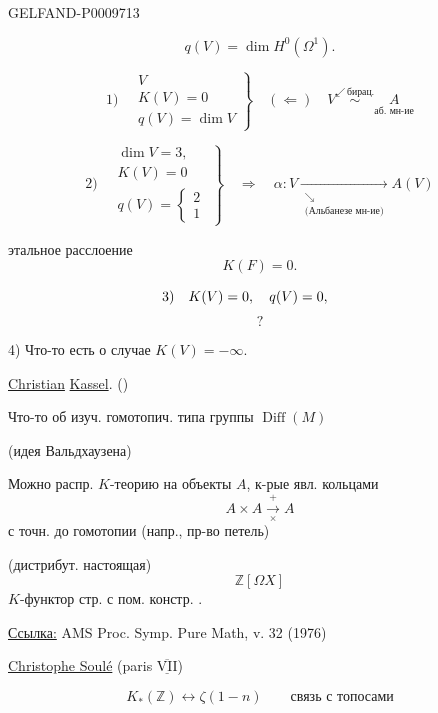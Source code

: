 \begin{GelfandAdjacentEvidence}{GELFAND-P000971}{3}


\[
 q(V)=\dim H^0(\Omega^1).
\]

\[
 1)\quad
 \left.\begin{gathered} V\\ K(V)=0\\ q(V)=\dim V \end{gathered}\right\}
 \quad(\Leftarrow)\quad
 V\overset{\swarrow\,\text{бирац.}}{\sim}\underset{\text{аб. мн-ие}}{A}
\]

\[
 2)\quad
 \left.\begin{gathered}
 \dim V=3,\\K(V)=0\\q(V)=\begin{cases}2\\1\end{cases}
 \end{gathered}\right\}
 \quad\Rightarrow\quad
 \alpha\colon V\underset{\substack{\searrow\\\text{(Альбанезе мн-ие)}}}{\longrightarrow}A(V)
\]

этальное расслоение
\[
 K(F)=0.
\]

\[
 3)\quad K(V)=0,\quad q(V)=0,
 \qquad\text{\vphantom{$K(V)$}}
\]
\[
 ?
\]

4) Что-то есть о случае $K(V)=-\infty$.

\underline{Christian} \underline{Kassel}. ()

Что-то об изуч. гомотопич. типа группы $\operatorname{Diff}(M)$

(идея Вальдхаузена)

Можно распр. $K$-теорию на объекты $A$, к-рые явл. кольцами
\[
 A\times A\overset{+}{\underset{\times}{\longrightarrow}}A
\]
с точн. до гомотопии (напр., пр-во петель)

(дистрибут. настоящая)
\[
 \mathbb Z[\Omega X]
\]
$K$-функтор стр. с пом. констр. .

\underline{Ссылка:} AMS Proc. Symp. Pure Math, v. 32 (1976)


\underline{Christophe Soulé} (paris \(\underline{\overline{\mathrm{VII}}}\))
\end{GelfandAdjacentEvidence}

\[
 K_*(\mathbb Z)\leftrightarrow\zeta(1-n)
 \qquad\text{связь с топосами}
\]

